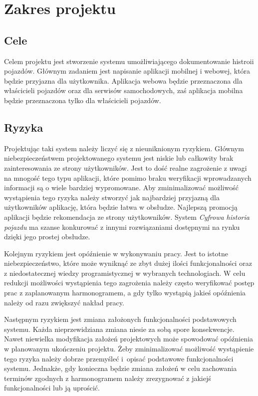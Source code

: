 \documentclass[12pt]{article}
\begin{document}
\newpage
\section{Zakres projektu}
\subsection{Cele}
Celem projektu jest stworzenie systemu umożliwiającego dokumentowanie histroii pojazdów. Głównym zadaniem jest napisanie aplikacji mobilnej i webowej, która będzie przyjazna dla użytkownika. Aplikacja webowa będzie przeznaczona dla właścicieli pojazdów oraz dla serwisów samochodowych, zaś aplikacja mobilna będzie przeznaczona tylko dla właścicieli pojazdów.
\subsection{Ryzyka}
Projektując taki system należy liczyć się z nieuniknionym ryzykiem. Głównym niebezpieczeństwem projektowanego systemu jest niskie lub całkowity brak zainteresowania ze strony użytkowników. Jest to dość realne zagrożenie z uwagi na mnogość tego typu aplikacji, które pomimo braku weryfikacji wprowadzanych informacji są o wiele bardziej wypromowane. Aby zminimalizować możliwość wystąpienia tego ryzyka należy stworzyć jak najbardziej przyjazną dla użytkowników aplikację, która będzie łatwa w obsłudze. Najlepszą promocją aplikacji będzie rekomendacja ze strony użytkowników. System \textit{ Cyfrowa historia pojazdu} ma szanse konkurować z innymi rozwiązaniami dostępnymi na rynku dzięki jego prostej obsłudze.

Kolejnym ryzykiem jest opóźnienie w wykonywaniu pracy. Jest to istotne niebezpieczeństwo, które może wyniknąć ze zbyt dużej ilości funkcjonalności oraz z niedostatecznej wiedzy programistycznej w wybranych technologiach. W celu redukcji możliwości wystąpienia tego zagrożenia należy często weryfikować postęp prac z zaplanowanym harmonogramem, a gdy tylko wystąpią jakieś opóźnienia należy od razu zwiększyć nakład pracy.

Następnym ryzykiem jest zmiana założonych funkcjonalności podstawowych systemu. Każda nieprzewidziana zmiana niesie za sobą spore konsekwencje. Nawet niewielka modyfikacja założeń projektowych może spowodować opóźnienia w planowanym ukończeniu projektu. Żeby zminimalizować możliwość wystąpienie tego ryzyka należy dobrze przemyśleć i~opisać podstawowe funkcjonalności systemu. Jednakże, gdy konieczna będzie zmiana założeń w celu zachowania terminów zgodnych z harmonogramem należy zrezygnować z jakiejś funkcjonalności lub ją uprościć.
\end{document}
